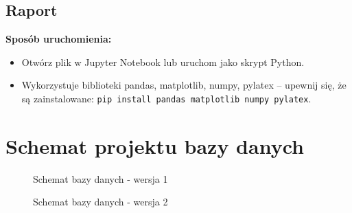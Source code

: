 \documentclass{article}
\theoremstyle{definition}
\begin{document}
	\subsection{Raport}
	\textbf{Sposób uruchomienia:}
	\begin{itemize}
		\item Otwórz plik w Jupyter Notebook lub uruchom jako skrypt Python.
		\item Wykorzystuje biblioteki pandas, matplotlib, numpy, pylatex – upewnij się, że są zainstalowane: \texttt{pip install pandas matplotlib numpy pylatex}.
	\end{itemize}
	
	\section{Schemat projektu bazy danych}
		\begin{figure}[H]    
		\centering
		\caption{Schemat bazy danych - wersja 1}
	\end{figure}
	
	\begin{figure}[H]    
		\centering
		\caption{Schemat bazy danych - wersja 2}
	\end{figure}
	
	
\end{document}
